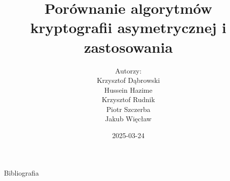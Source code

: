 \documentclass{beamer}
\title{Porównanie algorytmów kryptografii asymetrycznej i zastosowania}
\author{Autorzy:\\ Krzysztof Dąbrowski\\ Hussein Hazime\\ Krzysztof Rudnik\\ Piotr Szczerba\\ Jakub Więcław}
\date{2025-03-24}
\begin{document}
\begin{frame}
    \titlepage
\end{frame}













\begin{frame}{Bibliografia}
\printbibliography
\end{frame}
\end{document}

